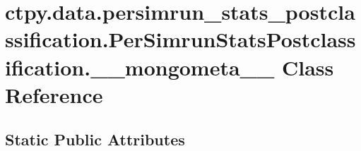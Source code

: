 \hypertarget{classctpy_1_1data_1_1persimrun__stats__postclassification_1_1_per_simrun_stats_postclassification_1_1____mongometa____}{\section{ctpy.\-data.\-persimrun\-\_\-stats\-\_\-postclassification.\-Per\-Simrun\-Stats\-Postclassification.\-\_\-\-\_\-mongometa\-\_\-\-\_\- Class Reference}
\label{classctpy_1_1data_1_1persimrun__stats__postclassification_1_1_per_simrun_stats_postclassification_1_1____mongometa____}
}
\subsection*{Static Public Attributes}
